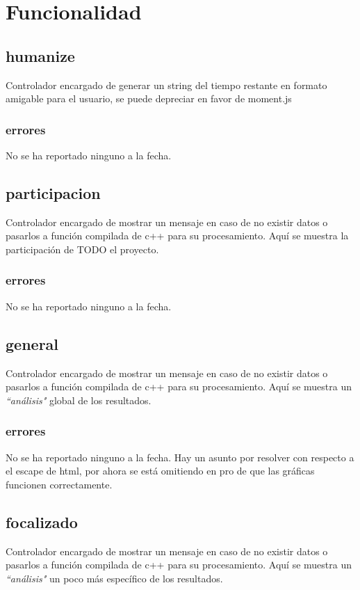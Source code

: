 \documentclass[10pt,a4paper]{book}
\begin{document}
	\section{Funcionalidad}
		

	\subsection{humanize}
	Controlador encargado de generar un string del tiempo restante en formato amigable para el usuario, se puede depreciar en favor de moment.js
	\subsubsection{errores}
	No se ha reportado ninguno a la fecha.
	
	\subsection{participacion}
	Controlador encargado de mostrar un mensaje en caso de no existir datos o pasarlos a función compilada de c++ para su procesamiento. Aquí se muestra la participación de TODO el proyecto.
	\subsubsection{errores}
	No se ha reportado ninguno a la fecha.
	
	\subsection{general}
	Controlador encargado de mostrar un mensaje en caso de no existir datos o pasarlos a función compilada de c++ para su procesamiento. Aquí se muestra un \textit{``análisis"} global de los resultados.
	\subsubsection{errores}
	No se ha reportado ninguno a la fecha. Hay un asunto por resolver con respecto a el escape de html, por ahora se está omitiendo en pro de que las gráficas funcionen correctamente. 
	
	\subsection{focalizado}
	Controlador encargado de mostrar un mensaje en caso de no existir datos o pasarlos a función compilada de c++ para su procesamiento. Aquí se muestra un \textit{``análisis"} un poco más específico de los resultados.
\end{document}
